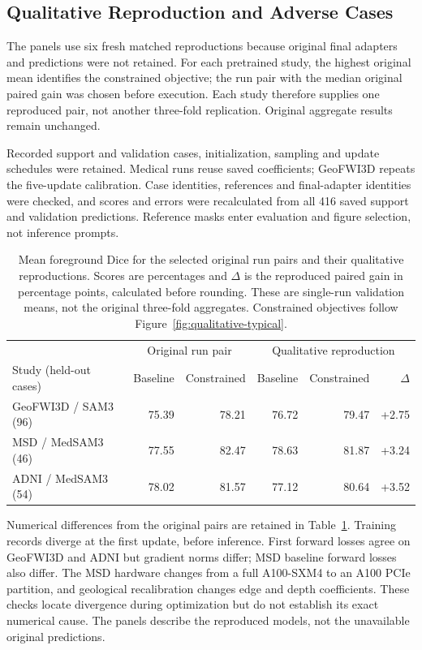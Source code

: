 \documentclass[12pt,a4paper]{article}
\begin{document}
\subsection{Qualitative Reproduction and Adverse Cases}
\label{sec:qualitative-predictions}
The panels use six fresh matched reproductions because original final
adapters and predictions were not retained. For each pretrained study,
the highest original mean identifies the constrained objective; the
run pair with the median original paired gain was chosen before
execution. Each study therefore supplies one reproduced pair, not
another three-fold replication. Original aggregate results remain unchanged.

Recorded support and validation cases, initialization, sampling and
update schedules were retained. Medical runs reuse saved coefficients;
GeoFWI3D repeats the five-update calibration. Case identities, references
and final-adapter identities were checked, and scores and errors were
recalculated from all 416 saved support and validation predictions.
Reference masks enter evaluation and figure selection, not inference
prompts.

\begin{table}[htbp]
\centering\small{}
\renewcommand{\arraystretch}{1.2}
\begin{tabular}{@{}lrrrrr@{}}
\hline
& \multicolumn{2}{c}{Original run pair} &
\multicolumn{3}{c}{Qualitative reproduction} \\
Study (held-out cases) & Baseline & Constrained & Baseline & Constrained & $\Delta$ \\
\hline
GeoFWI3D / SAM3 (96) & 75.39 & 78.21 & 76.72 & 79.47 & +2.75 \\
MSD / MedSAM3 (46) & 77.55 & 82.47 & 78.63 & 81.87 & +3.24 \\
ADNI / MedSAM3 (54) & 78.02 & 81.57 & 77.12 & 80.64 & +3.52 \\
\hline
\end{tabular}
\caption{Mean foreground Dice for the selected original run pairs and
their qualitative reproductions. Scores are percentages and $\Delta$ is
the reproduced paired gain in percentage points, calculated before
rounding. These are single-run validation means, not the original
three-fold aggregates. Constrained objectives follow
Figure~\ref{fig:qualitative-typical}.}
\label{tab:qualitative-reproduction-scores}
\end{table}

Numerical differences from the original pairs are retained in
Table~\ref{tab:qualitative-reproduction-scores}. Training records diverge
at the first update, before inference. First forward losses agree on
GeoFWI3D and ADNI but gradient norms differ; MSD baseline forward losses
also differ. The MSD hardware changes from a full A100-SXM4 to an A100
PCIe partition, and geological recalibration changes edge and depth
coefficients. These checks locate divergence during optimization but
do not establish its exact numerical cause. The panels describe the
reproduced models, not the unavailable original predictions.
\end{document}
